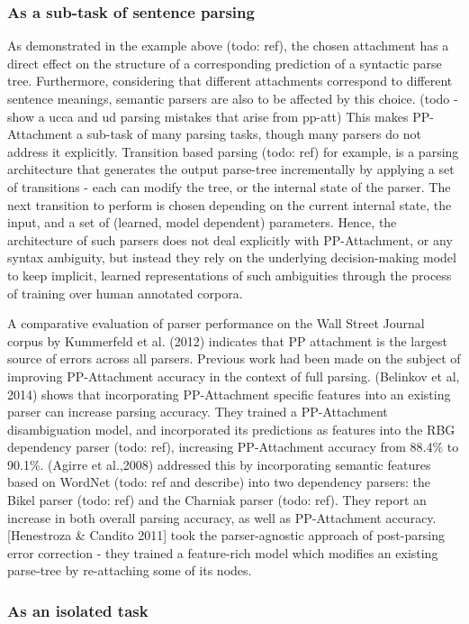 \subsubsection{As a sub-task of sentence parsing}
As demonstrated in the example above (todo: ref), the chosen attachment has a direct effect on the structure of a corresponding prediction of a syntactic parse tree. Furthermore, considering that different attachments correspond to different sentence meanings, semantic parsers are also to be affected by this choice. 
(todo - show a ucca and ud parsing mistakes that arise from pp-att)
This makes PP-Attachment a sub-task of many parsing tasks, though many parsers do not address it explicitly. Transition based parsing (todo: ref) for example, is a parsing architecture that generates the output parse-tree incrementally by applying a set of transitions - each can modify the tree, or the internal state of the parser. The next transition to perform is chosen depending on the current internal state, the input, and a set of (learned, model dependent) parameters. Hence, the architecture of such parsers does not deal explicitly with PP-Attachment, or any syntax ambiguity, but instead they rely on the underlying decision-making model to keep implicit, learned representations of such ambiguities through the process of training over human annotated corpora. 


A comparative evaluation of parser performance on the Wall Street Journal corpus by Kummerfeld et al. (2012) indicates that PP attachment is the largest source of errors across all parsers.  Previous work had been made on the subject of improving PP-Attachment accuracy in the context of full parsing. (Belinkov et al, 2014) shows that incorporating PP-Attachment specific features into an existing parser can increase parsing accuracy. They trained a PP-Attachment disambiguation model, and incorporated its predictions as features into the RBG dependency parser (todo: ref), increasing PP-Attachment accuracy from 88.4\% to 90.1\%.  (Agirre et al.,2008) addressed this by incorporating semantic features based on WordNet (todo: ref and describe) into two dependency parsers: the Bikel parser (todo: ref) and the Charniak parser (todo: ref). They report an increase in both overall parsing accuracy, as well as PP-Attachment accuracy. [Henestroza & Candito 2011] took the parser-agnostic approach of post-parsing error correction - they trained a feature-rich model which modifies an existing parse-tree by re-attaching some of its nodes. 

\subsubsection{As an isolated task}

